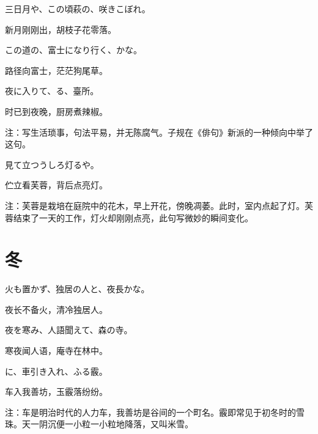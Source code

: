 \begin{haiku}
    {\FH 三日月や、この頃萩の、咲きこぼれ。}

    {\FK 新月刚刚出，胡枝子花零落。}
\end{haiku}

\begin{haiku}
    {\FH この道の、富士になり行く、かな。}

    {\FK 路径向富士，茫茫狗尾草。}
\end{haiku}

\begin{haiku}
    {\FH 夜に入りて、る、臺所。}

    {\FK 时已到夜晚，厨房煮辣椒。}

    {\FT 注：写生活琐事，句法平易，并无陈腐气。子规在《俳句》新派的一种倾向中举了这句。}
\end{haiku}

\begin{haiku}
    {\FH {}見て立つうしろ灯るや。}

    {\FK 伫立看芙蓉，背后点亮灯。}

    {\FT 注：芙蓉是栽培在庭院中的花木，早上开花，傍晚凋萎。此时，室内点起了灯。芙蓉结束了一天的工作，灯火却刚刚点亮，此句写微妙的瞬间变化。}
\end{haiku}

\section{\FK 冬}

\setcounter{haikucounter}{0}

\begin{haiku}
    {\FH 火も置かず、独居の人と、夜長かな。}

    {\FK 夜长不备火，清冷独居人。}
\end{haiku}

\begin{haiku}
    {\FH 夜を寒み、人語聞えて、森の寺。}

    {\FK 寒夜闻人语，庵寺在林中。}
\end{haiku}

\begin{haiku}
    {\FH {}に、車引き入れ、ふる霰。}

    {\FK 车入我善坊，玉霰落纷纷。}

    {\FT 注：车是明治时代的人力车，我善坊是谷间的一个町名。霰即常见于初冬时的雪珠。天一阴沉便一小粒一小粒地降落，又叫米雪。}
\end{haiku}

